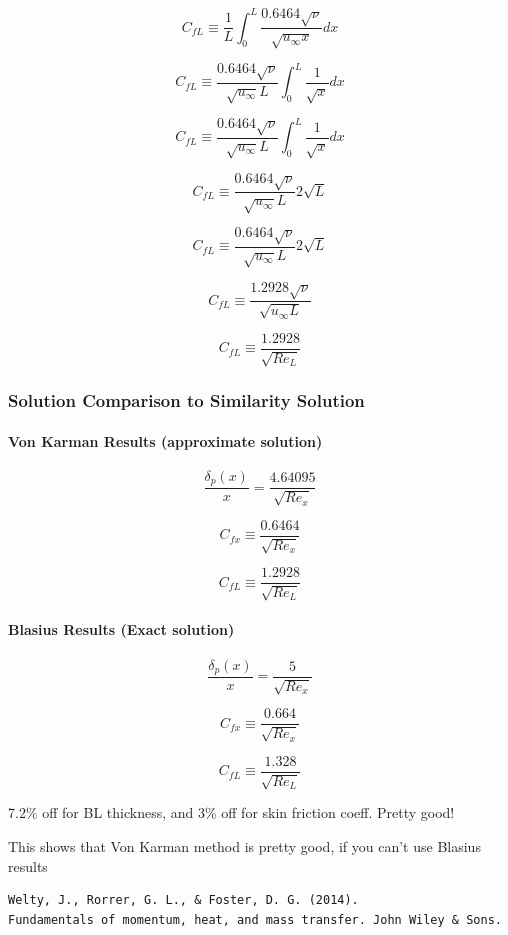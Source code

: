 \documentclass[11pt]{article}
\begin{document}
$$C_{fL} \equiv \frac{1}{L} \int_0^L\frac{0.6464 \sqrt{\nu}}{\sqrt{u_\infty x} } dx$$

$$C_{fL} \equiv \frac{0.6464 \sqrt{\nu}}{\sqrt{ u_\infty }L} \int_0^L\frac{1 }{ \sqrt{x} } dx$$

$$C_{fL} \equiv \frac{0.6464 \sqrt{\nu}}{\sqrt{ u_\infty }L} \int_0^L\frac{1 }{ \sqrt{x} } dx$$

$$C_{fL} \equiv \frac{0.6464 \sqrt{\nu}}{\sqrt{ u_\infty }L} 2 \sqrt{L}$$

$$C_{fL} \equiv \frac{0.6464 \sqrt{\nu}}{\sqrt{ u_\infty }L} 2 \sqrt{L}$$

$$C_{fL} \equiv \frac{1.2928 \sqrt{\nu}}{\sqrt{ u_\infty L}}  $$

$$C_{fL} \equiv \frac{1.2928 }{\sqrt{Re_L}}  $$


\subsubsection{Solution Comparison to Similarity Solution}

\paragraph{Von Karman Results (approximate solution)}
$$ \frac{\delta_p (x)}{x} =   \frac{4.64095 }{\sqrt{Re_x} }$$


$$C_{fx} \equiv \frac{0.6464}{ \sqrt{Re_x}}  $$

$$C_{fL} \equiv \frac{1.2928 }{\sqrt{Re_L}}  $$

\paragraph{Blasius Results (Exact solution) }


$$ \frac{\delta_p (x)}{x} =   \frac{5}{\sqrt{Re_x} }$$


$$C_{fx} \equiv \frac{0.664}{ \sqrt{Re_x}}  $$

$$C_{fL} \equiv \frac{1.328}{\sqrt{Re_L}}  $$

7.2\% off for BL thickness, and 3\% off for skin friction coeff.
Pretty good!

This shows that Von Karman method is pretty good, if you can't use Blasius results 

\begin{verbatim}
Welty, J., Rorrer, G. L., & Foster, D. G. (2014). 
Fundamentals of momentum, heat, and mass transfer. John Wiley & Sons.
\end{verbatim}
\end{document}
